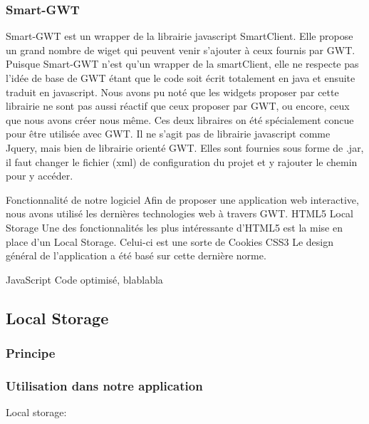 \subsubsection{Smart-GWT}
Smart-GWT est un wrapper de la librairie javascript SmartClient. Elle propose un grand nombre de wiget qui peuvent venir s'ajouter à ceux fournis par GWT. Puisque Smart-GWT n'est qu'un wrapper de la smartClient, elle ne respecte pas l'idée de base de GWT étant que le code soit écrit totalement en java et ensuite traduit en javascript. Nous avons pu noté que les widgets proposer par cette librairie ne sont pas aussi réactif que ceux proposer par GWT, ou encore, ceux que nous avons créer nous même.
Ces deux libraires on été spécialement concue pour être utilisée avec GWT. Il ne s'agit pas de librairie javascript comme Jquery, mais bien de librairie orienté GWT. Elles sont fournies sous forme de .jar, il faut changer le fichier (xml) de configuration du projet et y rajouter le chemin pour y accéder.



Fonctionnalité de notre logiciel
Afin de proposer une application web interactive, nous avons utilisé les dernières technologies web à travers GWT.
HTML5
	Local Storage
Une des fonctionnalités les plus intéressante d'HTML5 est la mise en place d'un Local Storage. Celui-ci est une sorte de Cookies
	CSS3
	Le design général de l'application a été basé sur cette dernière norme.

	JavaScript
	Code optimisé, blablabla
 
\subsection{Local Storage}
\subsubsection{Principe}
\subsubsection{Utilisation dans notre application}
Local storage:
  
